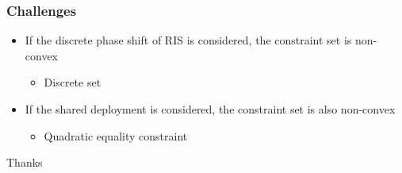 \documentclass[9pt]{beamer}
\begin{document}

\begin{frame}
  \frametitle{Challenges}
  \begin{itemize}
    \item If the discrete phase shift of RIS is considered, the constraint set is non-convex
    \begin{itemize}
       \item Discrete set
    \end{itemize}
    \item If the shared deployment is considered, the constraint set is also  non-convex
    \begin{itemize}
      \item  Quadratic equality constraint
   \end{itemize}
  \end{itemize}

\end{frame}



\begin{frame}
\Huge{\centerline{Thanks}}
\end{frame}

\end{document}
